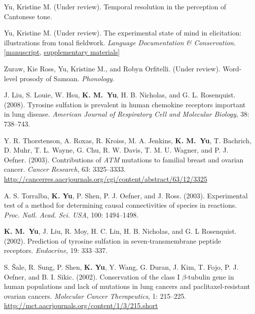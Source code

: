 \documentclass[10pt]{article}
\begin{document}
\begin{bibenum}
    \item Yu, Kristine M. (Under review). Temporal resolution in the perception of
      {C}antonese tone.

    \item Yu, Kristine M. (Under review). The experimental state of mind in
      elicitation: illustrations from tonal fieldwork. \emph{Language Documentation \&
        Conservation}. 
      [\href{https://github.com/krismyu/ldc-kiy/blob/master/paper/kiy.pdf?raw=true}{manuscript},
      \href{http://www.krisyu.org/resources/}{supplementary materials}]

    \item Zuraw, Kie Ross, Yu, Kristine M., and Robyn
      Orfitelli. (Under review). Word-level prosody of
      {S}amoan. \emph{Phonology}.

    \item  J. Liu, S. Louie, W. Hsu, \textbf{K. M.~Yu},
      H. B. Nicholas, and G. L. Rosenquist. (2008). Tyrosine
        sulfation is prevalent in human chemokine receptors important
        in lung disease. \emph{American Journal of Respiratory Cell and Molecular Biology}, 38:
      738--743.  

      \item Y. R. Thorstenson, A. Roxas, R. Kroiss, M. A. Jenkins,
        \textbf{K. M.~Yu}, T. Bachrich, D.  Muhr, T. L. Wayne, G. Chu,
        R. W. Davis, T. M. U. Wagner, and P. J. Oefner. (2003). 
        Contributions of \textit{ATM} mutations to familial breast and
        ovarian cancer. \emph{Cancer Research}, 63:
        3325--3333. \url{http://cancerres.aacrjournals.org/cgi/content/abstract/63/12/3325}  

    \item A. S. Torralba, \textbf{K. Yu}, P. Shen, P. J. Oefner, and
      J. Ross. (2003). Experimental
        test of a method for determining causal connectivities of
        species in reactions. \textit{Proc. Natl. Acad. Sci. USA},
      100: 1494--1498. 

    \item \textbf{K. M.~Yu}, J. Liu, R. Moy, H. C. Lin,
      H. B. Nicholas, and G. L Rosenquist. (2002). Prediction of
      tyrosine sulfation in seven-transmembrane peptide receptors.
    \emph{Endocrine}, 19: 333--337.  

    \item S. \v{S}ale, R. Sung, P. Shen, \textbf{K. Yu}, Y. Wang,
      G. Duran, J. Kim, T. Fojo, P. J. Oefner, and
      B. I. Sikic. (2002). Conservation
        of the class I $\beta$-tubulin gene in human populations and
        lack of mutations in lung cancers and paclitaxel-resistant
        ovarian cancers. \emph{Molecular Cancer Therapeutics}, 1:
        215--225. \url{http://mct.aacrjournals.org/content/1/3/215.short} 

\end{bibenum}
\end{document}
